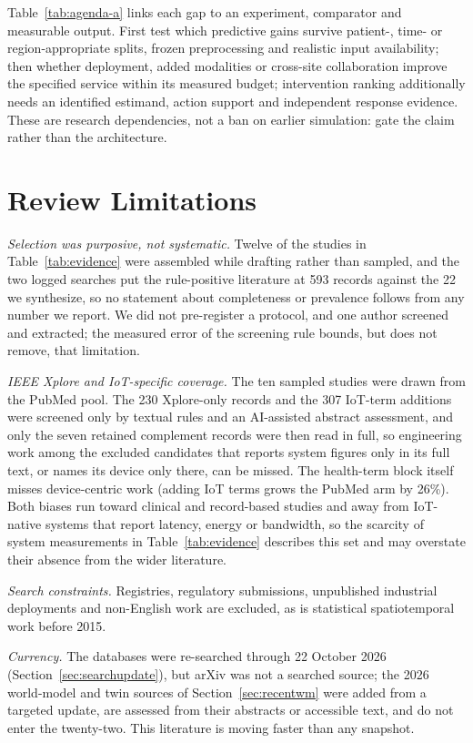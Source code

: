 \documentclass[journal]{IEEEtran}
\begin{document}
Table~\ref{tab:agenda-a} links each gap to an experiment, comparator and measurable output. First test which predictive gains survive patient-, time- or region-appropriate splits, frozen preprocessing and realistic input availability; then whether deployment, added modalities or cross-site collaboration improve the specified service within its measured budget; intervention ranking additionally needs an identified estimand, action support and independent response evidence. These are research dependencies, not a ban on earlier simulation: gate the claim rather than the architecture.

\section{Review Limitations}
\label{sec:limitations}
\emph{Selection was purposive, not systematic.} Twelve of the studies in Table~\ref{tab:evidence} were assembled while drafting rather than sampled, and the two logged searches put the rule-positive literature at 593 records against the 22 we synthesize, so no statement about completeness or prevalence follows from any number we report. We did not pre-register a protocol, and one author screened and extracted; the measured error of the screening rule bounds, but does not remove, that limitation.

\emph{IEEE Xplore and IoT-specific coverage.} The ten sampled studies were drawn from the PubMed pool. The 230 Xplore-only records and the 307 IoT-term additions were screened only by textual rules and an AI-assisted abstract assessment, and only the seven retained complement records were then read in full, so engineering work among the excluded candidates that reports system figures only in its full text, or names its device only there, can be missed. The health-term block itself misses device-centric work (adding IoT terms grows the PubMed arm by 26\%). Both biases run toward clinical and record-based studies and away from IoT-native systems that report latency, energy or bandwidth, so the scarcity of system measurements in Table~\ref{tab:evidence} describes this set and may overstate their absence from the wider literature.

\emph{Search constraints.} Registries, regulatory submissions, unpublished industrial deployments and non-English work are excluded, as is statistical spatiotemporal work before 2015.

\emph{Currency.} The databases were re-searched through 22 October 2026 (Section~\ref{sec:searchupdate}), but arXiv was not a searched source; the 2026 world-model and twin sources of Section~\ref{sec:recentwm} were added from a targeted update, are assessed from their abstracts or accessible text, and do not enter the twenty-two. This literature is moving faster than any snapshot.
\end{document}
